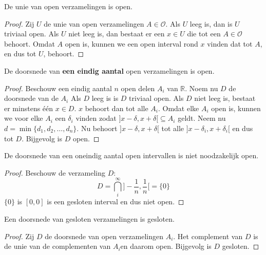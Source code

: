 \documentclass[main.tex]{subfiles}
\begin{document}
\begin{bpr}
  \label{pr:unie-open-verzamelingen-open}
  De unie van open verzamelingen is open.

  \begin{proof}
    Zij $U$ de unie van open verzamelingen $A\in \mathcal{O}$.
    Als $U$ leeg is, dan is $U$ triviaal open.
    Als $U$ niet leeg is, dan bestaat er een $x\in U$ die tot een $A \in \mathcal{O}$ behoort.
    Omdat $A$ open is, kunnen we een open interval rond $x$ vinden dat tot $A$, en dus tot $U$, behoort.
  \end{proof}
\end{bpr}

\begin{bpr}
  \label{pr:eindige-doorsnede-open-verzamelingen-open}
  De doorsnede van \textbf{een eindig aantal} open verzamelingen is open.

  \begin{proof}
    Beschouw een eindig aantal $n$ open delen $A_{i}$ van $\mathbb{R}$.
    Noem nu $D$ de doorsnede van de $A_{i}$
    Als $D$ leeg is is $D$ triviaal open.
    Als $D$ niet leeg is, bestaat er minstens \'e\'en $x\in D$.
    $x$ behoort dan tot alle $A_{i}$.
    Omdat elke $A_{i}$ open is, kunnen we voor elke $A_{i}$ een $\delta_{i}$ vinden zodat $]x-\delta,x+\delta[ \subseteq A_{i}$ geldt.
    Neem nu $d = \min\{ d_{1}, d_{2},\dotsc, d_{n}\}$.
    Nu behoort $]x-\delta,x+\delta[$ tot alle $]x-\delta_{i},x+\delta_{i}[$ en dus tot $D$.
    Bijgevolg is $D$ open.
  \end{proof}
\end{bpr}

\begin{tvb}
  De doorsnede van een oneindig aantal open intervallen is niet noodzakelijk open.

  \begin{proof}
    Beschouw de verzameling $D$:
    \[ D = \bigcap_{i}^{\infty}]-\frac{1}{n},\frac{1}{n}[ = \{ 0 \} \]
    $\{ 0 \}$ is $[0,0]$ is een gesloten interval en dus niet open.\needed
  \end{proof}
\end{tvb}

\begin{bpr}
  \label{pr:doorsnede-gesloten-verzamelingen-gesloten}
  Een doorsnede van gesloten verzamelingen is gesloten.

  \begin{proof}
    Zij $D$ de doorsnede van open verzamelingen $A_{i}$.
    Het complement van $D$ is de unie van de complementen van $A_{i}$\needed en daarom open.
    Bijgevolg is $D$ gesloten.
  \end{proof}
\end{bpr}
\end{document}
